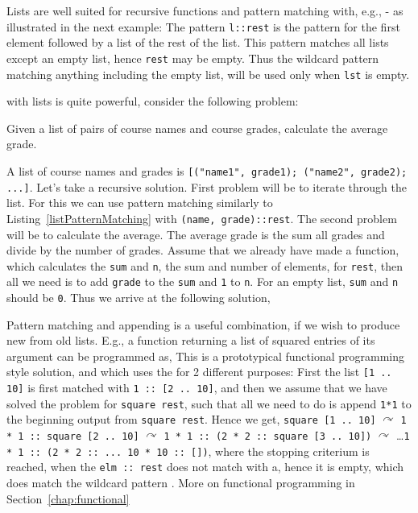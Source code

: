 Lists are well suited for recursive functions and pattern matching with, e.g., - as illustrated in the next example:
%
%
The pattern \lstinline!l::rest! is the pattern for the first element followed by a list of the rest of the list. This pattern matches all lists except an empty list, hence \lstinline!rest! may be empty. Thus the wildcard pattern matching anything including the empty list, will be used only when \lstinline!lst! is empty.

 with lists is quite powerful, consider the following problem:
\begin{problem}
  Given a list of pairs of course names and course grades, calculate the average grade.
\end{problem}
A list of course names and grades is \lstinline![("name1", grade1); ("name2", grade2); ...]!. Let's take a recursive solution. First problem will be to iterate through the list. For this we can use pattern matching similarly to Listing~\ref{listPatternMatching} with \lstinline!(name, grade)::rest!. The second problem will be to calculate the average. The average grade is the sum all grades and divide by the number of grades. Assume that we already have made a function, which calculates the \lstinline!sum! and \lstinline!n!, the sum and number of elements, for \lstinline!rest!, then all we need is to add \lstinline!grade! to the \lstinline!sum! and \lstinline!1! to \lstinline!n!. For an empty list, \lstinline!sum! and \lstinline!n! should be \lstinline!0!. Thus we arrive at the following solution,
%
%

Pattern matching and appending is a useful combination, if we wish to produce new from old lists. E.g., a function returning a list of squared entries of its argument can be programmed as,
%
%
This is a prototypical functional programming style solution, and which uses the \lexeme{::} for 2 different purposes: First the list \lstinline![1 .. 10]! is first matched with \lstinline!1 :: [2 .. 10]!, and then we assume that we have solved the problem for \lstinline!square rest!, such that all we need to do is append \lstinline!1*1! to the beginning output from \lstinline!square rest!. Hence we get, \lstinline!square [1 .. 10]! $\curvearrowright$ \lstinline!1 * 1 :: square [2 .. 10]! $\curvearrowright$ \lstinline!1 * 1 :: (2 * 2 :: square [3 .. 10])! $\curvearrowright$ \dots \lstinline!1 * 1 :: (2 * 2 :: ... 10 * 10 :: [])!, where the stopping criterium is reached, when the \lstinline!elm :: rest! does not match with a, hence it is empty, which does match the wildcard pattern \lexeme{_}. More on functional programming in Section~\ref{chap:functional}

